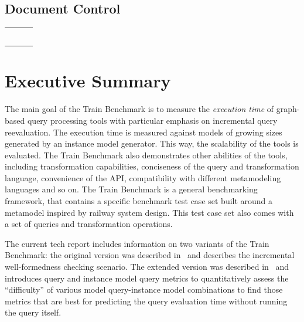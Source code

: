 \documentclass[12pt,twoside,a4paper]{report}
\begin{document}
\firstpage

\partnerpage


\newpage
\tableofcontents

\newpage
\section*{Document Control}

\begin{tabular}{*{3}{|p{.3\textwidth}}|}\hline
{} &
 &
\tabularnewline\hline
{} &  &  \tabularnewline\hline
{} &  &  \tabularnewline\hline
{} &  &  \tabularnewline\hline
{} &  &  \tabularnewline\hline
{} &  &  \tabularnewline
\hline
\end{tabular}

\clearpage
{}

\chapter*{Executive Summary}
The main goal of the Train Benchmark is to measure the \emph{execution time} of graph-based query processing tools with particular emphasis on incremental query reevaluation. The execution time is measured against models of growing sizes generated by an instance model generator. This way, the scalability of the tools is evaluated. The Train Benchmark also demonstrates other abilities of the tools, including transformation capabilities, conciseness of the query and transformation language, convenience of the API, compatibility with different metamodeling languages and so on. The Train Benchmark is a general benchmarking framework, that contains a specific benchmark test case set built around a metamodel inspired by railway system design. This test case set also comes with a set of queries and transformation operations. 

The current tech report includes information on two variants of the Train Benchmark: the original version was described in~\cite{SCP2014} and describes the incremental well-formedness checking scenario. The extended version was described in~\cite{ASE2013} and introduces query and instance model query metrics to quantitatively assess the ``difficulty'' of various model query-instance model combinations to find those metrics that are best for predicting the query evaluation time without running the query itself.
\end{document}
